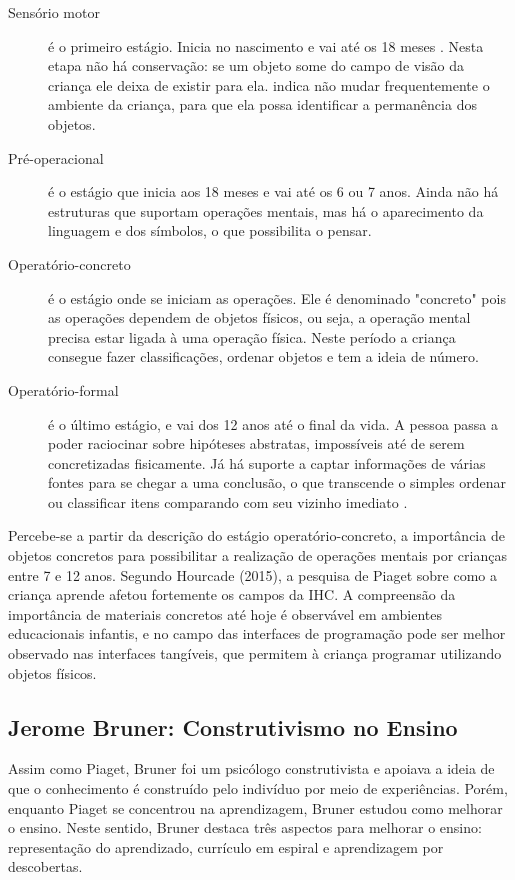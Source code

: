 \begin{description}
\item[Sensório motor] é o primeiro estágio. Inicia no nascimento e vai até os 18 meses \cite{piaget_development_1964}. Nesta etapa não há conservação: se um objeto some do campo de visão da criança ele deixa de existir para ela.  indica não mudar frequentemente o ambiente da criança, para que ela possa identificar a permanência dos objetos.

\item[Pré-operacional] é o estágio que inicia aos 18 meses e vai até os 6 ou 7 anos. Ainda não há estruturas que suportam operações mentais, mas há o aparecimento da linguagem e dos símbolos, o que possibilita o pensar.

\item[Operatório-concreto] é o estágio onde se iniciam as operações. Ele é denominado "concreto" pois as operações dependem de objetos físicos, ou seja, a operação mental precisa estar ligada à uma operação física. Neste período a criança consegue fazer classificações, ordenar objetos e tem a ideia de número.

\item[Operatório-formal] é o último estágio, e vai dos 12 anos até o final da vida. A pessoa passa a poder raciocinar sobre hipóteses abstratas, impossíveis até de serem concretizadas fisicamente. Já há suporte a captar informações de várias fontes para se chegar a uma conclusão, o que transcende o simples ordenar ou classificar itens comparando com seu vizinho imediato \cite{piaget_development_1964}.

\end{description}

Percebe-se a partir da descrição do estágio operatório-concreto, a importância de objetos concretos para possibilitar a realização de operações mentais por crianças entre 7 e 12 anos. Segundo Hourcade (2015), a pesquisa de Piaget sobre como a criança aprende afetou fortemente os campos da IHC. A compreensão da importância de materiais concretos até hoje é observável em ambientes educacionais infantis, e no campo das interfaces de programação pode ser melhor observado nas interfaces tangíveis, que permitem à criança programar utilizando objetos físicos.

\subsection{Jerome Bruner: Construtivismo no Ensino}
\label{sub_jerome_bruner}
Assim como Piaget, Bruner foi um psicólogo construtivista e apoiava a ideia de que o conhecimento é construído pelo indivíduo por meio de experiências. Porém, enquanto Piaget se concentrou na aprendizagem, Bruner estudou como melhorar o ensino. Neste sentido, Bruner destaca três aspectos para melhorar o ensino: representação do aprendizado, currículo em espiral e aprendizagem por descobertas.


